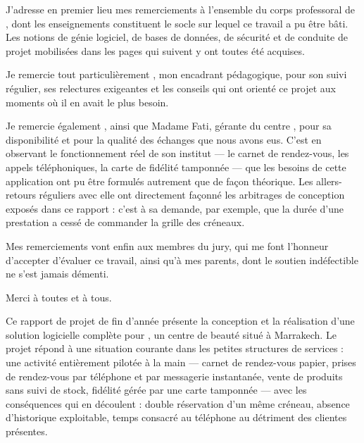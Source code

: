 \vspace{0.3cm}

J'adresse en premier lieu mes remerciements à l'ensemble du corps professoral
de \nouvelleEtablissement, dont les enseignements constituent le socle sur
lequel ce travail a pu être bâti. Les notions de génie logiciel, de bases de
données, de sécurité et de conduite de projet mobilisées dans les pages qui
suivent y ont toutes été acquises.

\vspace{0.3cm}

Je remercie tout particulièrement \nouvelleEncadrantPedagogique, mon
encadrant pédagogique, pour son suivi régulier, ses relectures exigeantes et
les conseils qui ont orienté ce projet aux moments où il en avait le plus
besoin.

\vspace{0.3cm}

Je remercie également \nouvelleEncadrantEntreprise, ainsi que Madame Fati,
gérante du centre \yani, pour sa disponibilité et pour la qualité des échanges
que nous avons eus. C'est en observant le fonctionnement réel de son institut
--- le carnet de rendez-vous, les appels téléphoniques, la carte de fidélité
tamponnée --- que les besoins de cette application ont pu être formulés
autrement que de façon théorique. Les allers-retours réguliers avec elle ont
directement façonné les arbitrages de conception exposés dans ce rapport :
c'est à sa demande, par exemple, que la durée d'une prestation a cessé de
commander la grille des créneaux.

\vspace{0.3cm}

Mes remerciements vont enfin aux membres du jury, qui me font l'honneur
d'accepter d'évaluer ce travail, ainsi qu'à mes parents, dont le soutien
indéfectible ne s'est jamais démenti.

\vspace{0.5cm}

Merci à toutes et à tous.


Ce rapport de projet de fin d'année présente la conception et la réalisation
d'une solution logicielle complète pour \yani, un centre de beauté situé à
Marrakech. Le projet répond à une situation courante dans les petites
structures de services : une activité entièrement pilotée à la main --- carnet
de rendez-vous papier, prises de rendez-vous par téléphone et par messagerie
instantanée, vente de produits sans suivi de stock, fidélité gérée par une
carte tamponnée --- avec les conséquences qui en découlent : double
réservation d'un même créneau, absence d'historique exploitable, temps
consacré au téléphone au détriment des clientes présentes.

